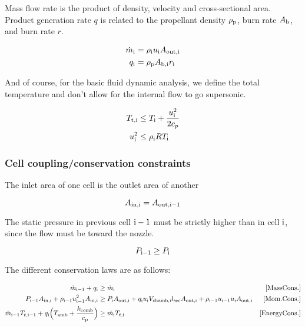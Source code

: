 Mass flow rate is the product of density, velocity and cross-sectional area.
Product generation rate $q$ is related to the propellant density $\rho_{\rm{p}}$,
burn rate $A_{\rm{b}}$, and burn rate $r$.

\begin{align}
    \dot{m}_{\rm{i}} &= \rho_{\rm{i}} u_{\rm{i}} A_{\rm{out}, \rm{i}} \\
    q_{\rm{i}} &= \rho_{\rm{p}} A_{\rm{b, i}} r_{\rm{i}} \\
\end{align}

And of course, for the basic fluid dynamic analysis, we define the total temperature
and don't allow for the internal flow to go supersonic.

\begin{align}
    T_{\rm{t,i}} &\leq T_{\rm{i}} + \frac{u_{\rm{i}}^2}{2c_{p}} \\
    u_{\rm{i}}^2 &\leq \rho_{\rm{i}} R T_{\rm{i}}
\end{align}

\subsubsection{Cell coupling/conservation constraints}

The inlet area of one cell is the outlet area of another

\begin{equation}
    A_{\rm{in}, \rm{i}} = A_{\rm{out}, \rm{i}-1}
\end{equation}

The static pressure in previous cell $\rm{i}-1$ must be strictly higher
than in cell $\rm{i}$, since the flow must be toward the nozzle.

\begin{equation}
    P_{\rm{i}-1} \geq P_{\rm{i}}
\end{equation}

The different conservation laws are as follows:

\begin{align}
    \dot{m}_{\rm{i}-1} + q_{\rm{i}}
    &\geq
    \dot{m}_{\rm{i}} &\rm{[Mass Cons.]}\\
    P_{\rm{i}-1} A_{\rm{in}, \rm{i}} + \rho_{\rm{i}-1} u_{\rm{i}-1}^2 A_{\rm{in},\rm{i}}
    &\geq
    P_{\rm{i}} A_{\rm{out}, \rm{i}} + q_{\rm{i}} u_{\rm{i}} V_{\rm{chamb},\rm{i}} l_{\rm{sec}} A_{\rm{out},\rm{i}}
    + \rho_{\rm{i}-1} u_{\rm{i}-1} u_{\rm{i}} A_{\rm{out}, \rm{i}}&[\mathrm{Mom. Cons.}] \\
    \dot{m}_{\rm{i}-1} T_{t, \rm{i}-1} + q_{\rm{i}}\Big(T_{\rm{amb}} + \frac{k_{\rm{comb}}}{c_{\rm{p}}}\Big)
    &\geq
    \dot{m_{\rm{i}}} T_{t, \rm{i}} &\rm{[Energy Cons.]} \\
\end{align}

